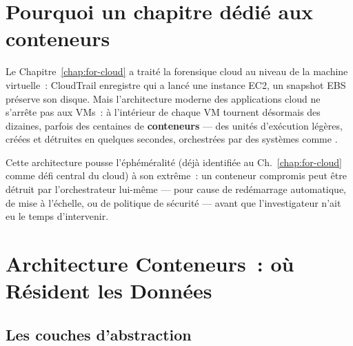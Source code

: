 \bigskip

\section*{Pourquoi un chapitre dédié aux conteneurs}

Le Chapitre~\ref{chap:for-cloud} a traité la forensique cloud au niveau
de la machine virtuelle~: CloudTrail enregistre qui a lancé une instance
EC2, un snapshot EBS préserve son disque. Mais l'architecture moderne
des applications cloud ne s'arrête pas aux VMs~: à l'intérieur de
chaque VM tournent désormais des dizaines, parfois des centaines de
\textbf{conteneurs} --- des unités d'exécution légères, créées et
détruites en quelques secondes, orchestrées par des systèmes comme
.

Cette architecture pousse l'éphéméralité (déjà identifiée au
Ch.~\ref{chap:for-cloud} comme défi central du cloud) à son extrême~:
un conteneur compromis peut être détruit par l'orchestrateur lui-même
--- pour cause de redémarrage automatique, de mise à l'échelle, ou
de politique de sécurité --- avant que l'investigateur n'ait eu le
temps d'intervenir.

\separateur

\section{Architecture Conteneurs~: où Résident les Données}
\label{sec:architecture-conteneurs}

\subsection{Les couches d'abstraction}

